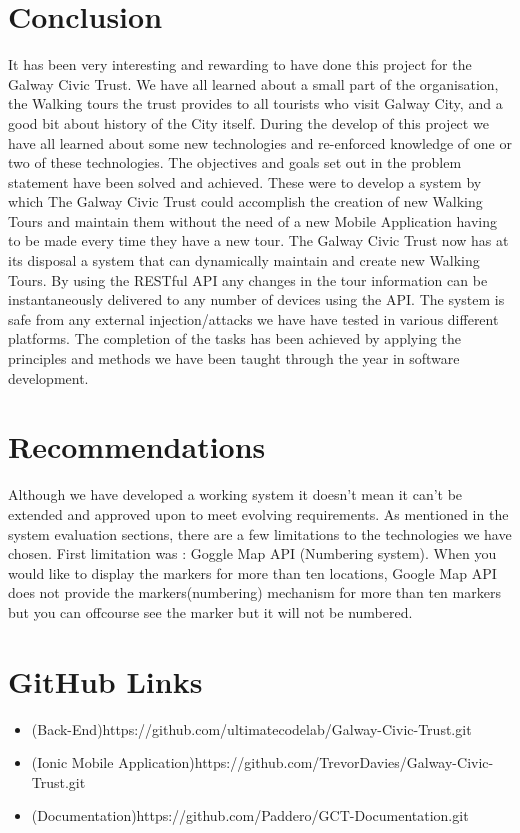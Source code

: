 \chapter{Conclusion}
It has been very interesting and rewarding to have done this project for the Galway Civic Trust. We have all learned about a small part of the organisation, the Walking tours the trust provides to all tourists who visit Galway City, and a good bit about history of the City itself.   
During the develop of this project we have all learned about some new technologies and re-enforced knowledge of one or two of these technologies.
The objectives and goals set out in the problem statement have been solved and achieved. These were to develop a system by which The Galway Civic Trust could accomplish the creation of new Walking Tours and maintain them without the need of a new Mobile Application having to be made every time they have a new tour.
The Galway Civic Trust now has at its disposal a system that can dynamically maintain and create new Walking Tours. By using the RESTful API any changes in the tour information can be instantaneously delivered to any number of devices using the API. The system is safe from any external injection/attacks we have have tested in various different platforms.  
The completion of the tasks has been achieved by applying the principles and methods we have been taught through the year in software development.  



\chapter{Recommendations}
Although we have developed a working system it doesn't mean it can't be extended and approved upon to meet evolving requirements.
As mentioned in the system evaluation sections, there are a few limitations to the technologies we have chosen. 
First limitation was : Goggle Map API (Numbering system). When you would like to display the markers for more than ten locations, Google Map API does not provide the markers(numbering) mechanism for more than ten markers but you can offcourse see the marker but it will not be numbered. 



\chapter{GitHub Links}
\begin{itemize}
	\item{(Back-End)https://github.com/ultimatecodelab/Galway-Civic-Trust.git}
	\item{(Ionic Mobile Application)https://github.com/TrevorDavies/Galway-Civic-Trust.git}
	\item{(Documentation)https://github.com/Paddero/GCT-Documentation.git}
\end{itemize}
